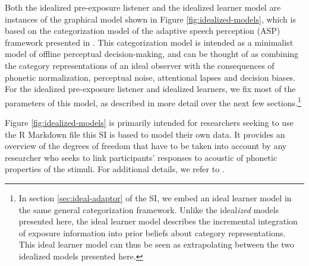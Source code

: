 \documentclass[
  11pt,
  man,mask,floatsintext]{apa6}
\begin{document}
Both the idealized pre-exposure listener and the idealized learner model are instances of the graphical model shown in Figure \ref{fig:idealized-models}, which is based on the categorization model of the adaptive speech perception (ASP) framework presented in \textcite{xie2023}. This categorization model is intended as a minimalist model of offline perceptual decision-making, and can be thought of as combining the category representations of an ideal observer with the consequences of phonetic normalization, perceptual noise, attentional lapses and decision biases. For the idealized pre-exposure listener and idealized learners, we fix most of the parameters of this model, as described in more detail over the next few sections.\footnote{In section \ref{sec:ideal-adaptor} of the SI, we embed an ideal learner model in the same general categorization framework. Unlike the ideal\emph{ized} models presented here, the ideal learner model describes the incremental integration of exposure information into prior beliefs about category representations. This ideal learner model can thus be seen as extrapolating between the two idealized models presented here.}

Figure \ref{fig:idealized-models} is primarily intended for researchers seeking to use the R Markdown file this SI is based to model their own data. It provides an overview of the degrees of freedom that have to be taken into account by any researcher who seeks to link participants' responses to acoustic of phonetic properties of the stimuli. For additional details, we refer to \textcite{xie2023}.
\end{document}
